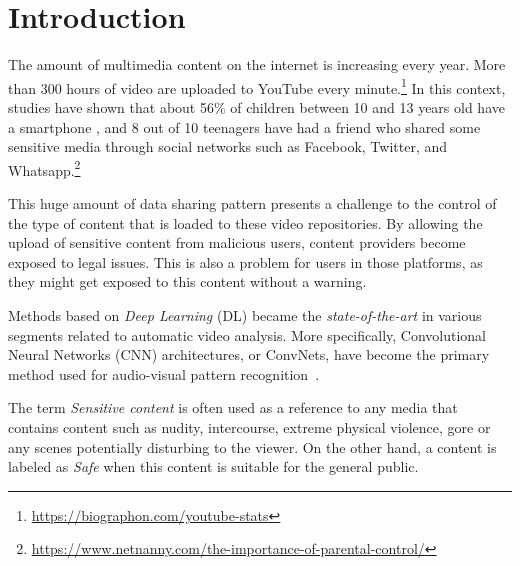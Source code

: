 \newpage

\chapter{Introduction}
\label{chap:introduction}

The amount of multimedia content on the internet is increasing every year.
More than 300 hours of video are uploaded to YouTube every minute.\footnote{\url{https://biographon.com/youtube-stats}}
In this context, studies have shown that about 56\% of children between 10 and 13 years old have a smartphone \cite{remosoftware,chollet2017xception}, and 8 out of 10 teenagers have had a friend who shared some sensitive media through social networks such as Facebook, Twitter, and Whatsapp.\footnote{\url{https://www.netnanny.com/the-importance-of-parental-control/}}



This huge amount of data sharing pattern presents a challenge to the control of the type of content that is loaded to these video repositories. By allowing the upload of sensitive content from malicious users, content providers become exposed to legal issues. This is also a problem for users in those platforms, as they might get exposed to this content without a warning.

Methods based on \textit{Deep Learning} (DL) became the \textit{state-of-the-art} in various segments related to automatic video analysis. More specifically, 
Convolutional Neural Networks (CNN) architectures, or ConvNets, have become the primary method used for audio-visual pattern recognition~\cite{nayak2021comprehensive,sharma2021video,ullah2021analysis}.

The term \emph{Sensitive content} is often used as a reference to any media that contains content such as nudity, intercourse, extreme physical violence, gore or any scenes potentially disturbing to the viewer.
On the other hand, a content is labeled as \emph{Safe} when this content is suitable for the general public.


